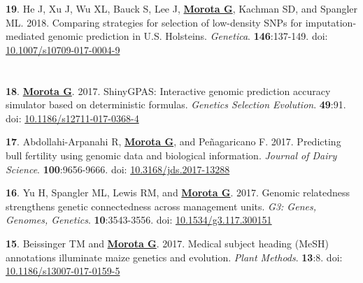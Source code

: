 \documentclass[margin,line,10pt]{res}
\newenvironment{list1}{
  \begin{list}{\ding{113}}{%
      \setlength{\itemsep}{0in}
      \setlength{\parsep}{0in} \setlength{\parskip}{0in}
      \setlength{\topsep}{0in} \setlength{\partopsep}{0in} 
      \setlength{\leftmargin}{0.17in}}}{\end{list}}
\begin{document}
\begin{resume}
\begin{list1}
    \vspace{0.5cm}
  
\item  [{\bf 19}.] He J, Xu J, Wu XL, Bauck S, Lee J, \textbf{\underline{Morota G}}, Kachman SD, and Spangler ML. 2018. Comparing strategies for selection of low-density SNPs for imputation-mediated genomic prediction in U.S. Holsteins. \emph{Genetica}. \textbf{146}:137-149. doi: \textcolor{blue}{\href{https://dx.doi.org/10.1007/s10709-017-0004-9}{10.1007/s10709-017-0004-9}}

\end{list1}


\section{}

\begin{list1}

\item  [{\bf 18}.] \textbf{\underline{Morota G}}. 2017. ShinyGPAS: Interactive genomic prediction accuracy simulator based on deterministic formulas. \emph{Genetics Selection Evolution}. \textbf{49}:91. doi: \textcolor{blue}{\href{https://dx.doi.org/10.1186/s12711-017-0368-4}{10.1186/s12711-017-0368-4}}

  \vspace{0.5cm}
    
\item  [{\bf 17}.] Abdollahi-Arpanahi R, \textbf{\underline{Morota G}}, and  Pe\~{n}agaricano F. 2017. Predicting bull fertility using genomic data and biological information. \emph{Journal of Dairy Science}. \textbf{100}:9656-9666. doi: \textcolor{blue}{\href{https://doi.org/10.3168/jds.2017-13288}{10.3168/jds.2017-13288}}

    \vspace{0.5cm}
    
  \item  [{\bf 16}.]  Yu H, Spangler ML, Lewis RM, and \textbf{\underline{Morota G}}. 2017. Genomic relatedness strengthens genetic connectedness across management units. \emph{G3: Genes, Genomes, Genetics}. \textbf{10}:3543-3556. doi: \textcolor{blue}{\href{https://doi.org/10.1534/g3.117.300151}{10.1534/g3.117.300151}}

    \vspace{0.5cm}
    
\item [{\bf 15}.] Beissinger TM and \textbf{\underline{Morota G}}. 2017. Medical subject heading (MeSH) annotations illuminate maize genetics and evolution. \emph{Plant Methods}. \textbf{13}:8. doi: \textcolor{blue}{\href{http://dx.doi.org/10.1186/s13007-017-0159-5}{10.1186/s13007-017-0159-5}}


\end{list1}
\end{resume}
\end{document}
